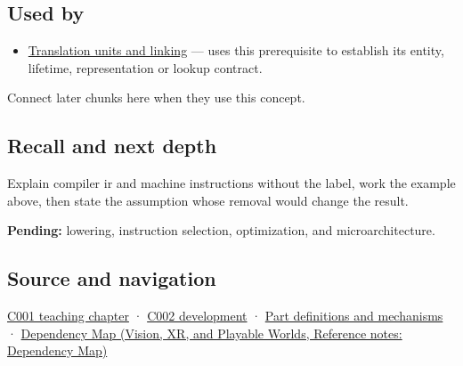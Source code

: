 \subsection{Used by}\label{appendix-942ad41afb30-used-by}

\hypertarget{appendix-942ad41afb30-used-by}{}

\begin{itemize}
\tightlist
\item
  \hyperref[appendix-806686359e1b]{Translation units and linking} --- uses this prerequisite to establish its entity, lifetime, representation or lookup contract.
\end{itemize}

Connect later chunks here when they use this concept.

\subsection{Recall and next depth}\label{appendix-942ad41afb30-recall-and-next-depth}

\hypertarget{appendix-942ad41afb30-recall-and-next-depth}{}

Explain compiler ir and machine instructions without the label, work the example above, then state the assumption whose removal would change the result.

\textbf{Pending:} lowering, instruction selection, optimization, and microarchitecture.

\subsection{Source and navigation}\label{appendix-942ad41afb30-source-and-navigation}

\hypertarget{appendix-942ad41afb30-source-and-navigation}{}

\hyperref[01-foundations-i-ch001-from-a-signal-to-an-interpretation]{C001 teaching chapter} · \hyperref[01-foundations-i-ch001-arithmetic-becomes-a-policy]{C002 development} · \hyperref[appendix-fd090d982a15]{Part definitions and mechanisms} · \href{../07-Vision-XR-and-Playable-Worlds/main.pdf\#nameddest=appendix-4ad47bdd269a}{Dependency Map (Vision, XR, and Playable Worlds, Reference notes: Dependency Map)}
